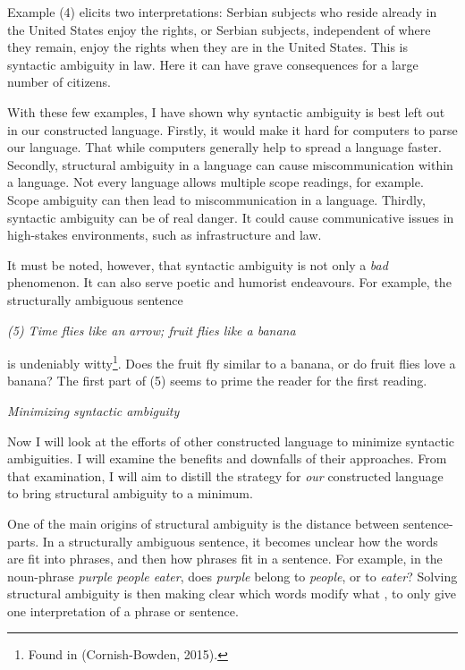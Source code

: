 \noindent Example (4) elicits two interpretations: Serbian subjects who reside already in the United States enjoy the rights, or Serbian subjects, independent of where they remain, enjoy the rights when they are in the United States. This is syntactic ambiguity in law. Here it can have grave consequences for a large number of citizens.

With these few examples, I have shown why syntactic ambiguity is best left out in our constructed language. Firstly, it would make it hard for computers to parse our language. That while computers generally help to spread a language faster. Secondly, structural ambiguity in a language can cause miscommunication within a language. Not every language allows multiple scope readings, for example. Scope ambiguity can then lead to miscommunication in a language. Thirdly, syntactic ambiguity can be of real danger. It could cause communicative issues in high-stakes environments, such as infrastructure and law.  

It must be noted, however, that syntactic ambiguity is not only a {\it bad} phenomenon. It can also serve poetic and humorist endeavours. For example, the structurally ambiguous sentence

\begin{singlespace*}
	\begin{center}
		{\it (5) Time flies like an arrow; fruit flies like a banana}
	\end{center}
\end{singlespace*}

\noindent is undeniably witty\footnote{Found in (Cornish-Bowden, 2015).}. Does the fruit fly similar to a banana, or do fruit flies love a banana? The first part of (5) seems to prime the reader for the first reading.  

{\it Minimizing syntactic ambiguity}

\noindent Now I will look at the efforts of other constructed language to minimize syntactic ambiguities. I will examine the benefits and downfalls of their approaches. From that examination, I will aim to distill the strategy for {\it our} constructed language to bring structural ambiguity to a minimum. 

One of the main origins of structural ambiguity is the distance between sentence-parts. In a structurally ambiguous sentence, it becomes unclear how the words are fit into phrases, and then how phrases fit in a sentence. For example, in the noun-phrase {\it purple people eater}, does {\it purple} belong to {\it people}, or to {\it eater}? Solving structural ambiguity is then making clear which words modify what , to only give one interpretation of a phrase or sentence.

